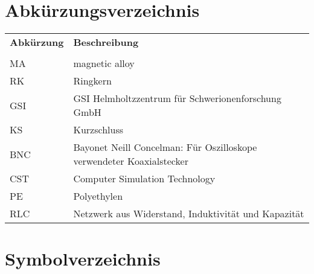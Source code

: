 \chapter*{Abk\"urzungsverzeichnis}
\begin{tabular}{p{} p{}}
\textbf{Abk\"urzung} & \textbf{Beschreibung} \\
 & \\
MA & magnetic alloy \\
RK & Ringkern \\
GSI & GSI Helmholtzzentrum f\"ur Schwerionenforschung GmbH\\
KS & Kurzschluss \\
BNC & Bayonet Neill Concelman: F\"ur Oszilloskope verwendeter Koaxialstecker \\
CST & Computer Simulation Technology \\
PE & Polyethylen \\
RLC & Netzwerk aus Widerstand, Induktivit\"at und Kapazit\"at \\
\end{tabular}

\cleardoublepage

\chapter*{Symbolverzeichnis}

